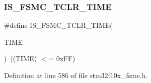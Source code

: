 \subsubsection{\texorpdfstring{I\+S\+\_\+\+F\+S\+M\+C\+\_\+\+T\+C\+L\+R\+\_\+\+T\+I\+ME}{IS\_FSMC\_TCLR\_TIME}}
{\footnotesize\ttfamily \#define I\+S\+\_\+\+F\+S\+M\+C\+\_\+\+T\+C\+L\+R\+\_\+\+T\+I\+ME(\begin{DoxyParamCaption}\item[{}]{T\+I\+ME }\end{DoxyParamCaption})~((T\+I\+ME) $<$= 0x\+F\+F)}



Definition at line 586 of file stm32f10x\+\_\+fsmc.\+h.

